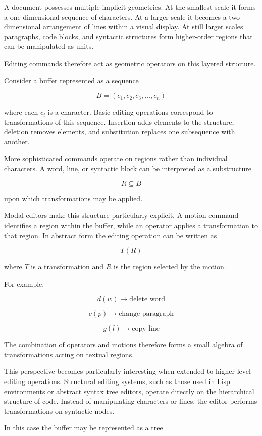 \documentclass[11pt]{article}
\theoremstyle{definition}
\begin{document}
A document possesses multiple implicit geometries. At the smallest
scale it forms a one-dimensional sequence of characters. At a larger
scale it becomes a two-dimensional arrangement of lines within a visual
display. At still larger scales paragraphs, code blocks, and syntactic
structures form higher-order regions that can be manipulated as units.

Editing commands therefore act as geometric operators on this layered
structure.

Consider a buffer represented as a sequence

\[
B = (c_1, c_2, c_3, \dots , c_n)
\]

where each $c_i$ is a character. Basic editing operations correspond to
transformations of this sequence. Insertion adds elements to the
structure, deletion removes elements, and substitution replaces one
subsequence with another.

More sophisticated commands operate on regions rather than individual
characters. A word, line, or syntactic block can be interpreted as a
substructure

\[
R \subseteq B
\]

upon which transformations may be applied.

Modal editors make this structure particularly explicit. A motion
command identifies a region within the buffer, while an operator
applies a transformation to that region. In abstract form the editing
operation can be written as

\[
T(R)
\]

where $T$ is a transformation and $R$ is the region selected by the
motion.

For example,

\[
d(w) \rightarrow \text{delete word}
\]

\[
c(p) \rightarrow \text{change paragraph}
\]

\[
y(l) \rightarrow \text{copy line}
\]

The combination of operators and motions therefore forms a small
algebra of transformations acting on textual regions.

This perspective becomes particularly interesting when extended to
higher-level editing operations. Structural editing systems, such as
those used in Lisp environments or abstract syntax tree editors,
operate directly on the hierarchical structure of code. Instead of
manipulating characters or lines, the editor performs transformations
on syntactic nodes.

In this case the buffer may be represented as a tree
\end{document}
